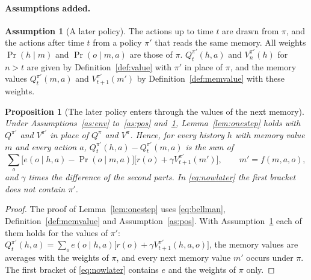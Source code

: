 \documentclass{article}
\newtheorem{proposition}{Proposition}[section]
\theoremstyle{definition}
\newtheorem{assumption}{Assumption}
\numberwithin{equation}{section}
\begin{document}
\paragraph{Assumptions added.}
\begin{assumption}[A later policy]\label{as:later}
The actions up to time $t$ are drawn from $\pi$, and the actions after time $t$ from a policy $\pi'$ that reads the same memory. All weights $\Pr(h\mid m)$ and $\Pr(o\mid m,a)$ are those of $\pi$. $Q^{\pi'}_t(h,a)$ and $V^{\pi'}_n(h)$ for $n>t$ are given by Definition~\ref{def:value} with $\pi'$ in place of $\pi$, and the memory values $Q^{\pi'}_t(m,a)$ and $V^{\pi'}_{t+1}(m')$ by Definition~\ref{def:memvalue} with these weights.
\end{assumption}

\begin{proposition}[The later policy enters through the values of the next memory]\label{prop:later}
Under Assumptions~\ref{as:env} to~\ref{as:pos} and~\ref{as:later}, Lemma~\ref{lem:onestep} holds with $Q^{\pi'}$ and $V^{\pi'}$ in place of $Q^\pi$ and $V^\pi$. Hence, for every history $h$ with memory value $m$ and every action $a$, $Q^{\pi'}_t(h,a)-Q^{\pi'}_t(m,a)$ is the sum of
\begin{equation}\label{eq:nowlater}
\sum_o\big[e(o\mid h,a)-\Pr(o\mid m,a)\big]\big[r(o)+\gamma V^{\pi'}_{t+1}(m')\big],\qquad m'=f(m,a,o),
\end{equation}
and $\gamma$ times the difference of the second parts. In \eqref{eq:nowlater} the first bracket does not contain $\pi'$.
\end{proposition}

\begin{proof}
The proof of Lemma~\ref{lem:onestep} uses \eqref{eq:bellman}, Definition~\ref{def:memvalue} and Assumption~\ref{as:pos}. With Assumption~\ref{as:later} each of them holds for the values of $\pi'$: $Q^{\pi'}_t(h,a)=\sum_oe(o\mid h,a)\big[r(o)+\gamma V^{\pi'}_{t+1}(h,a,o)\big]$, the memory values are averages with the weights of $\pi$, and every next memory value $m'$ occurs under $\pi$. The first bracket of \eqref{eq:nowlater} contains $e$ and the weights of $\pi$ only.
\end{proof}
\end{document}

